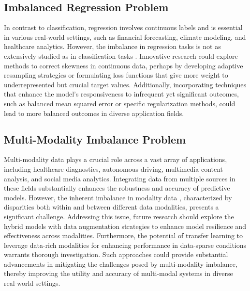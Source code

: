 \subsection{Imbalanced Regression Problem}

In contrast to classification, regression involves continuous labels and is essential in various real-world settings, such as financial forecasting, climate modeling, and healthcare analytics. However, the imbalance in regression tasks is not as extensively studied as in classification tasks \cite{gong2022ranksim,yang2021delving,gong2022ranksim}. Innovative research could explore methods to correct skewness in continuous data, perhaps by developing adaptive resampling strategies or formulating loss functions that give more weight to underrepresented but crucial target values. Additionally, incorporating techniques that enhance the model's responsiveness to infrequent yet significant outcomes, such as balanced mean squared error or specific regularization methods, could lead to more balanced outcomes in diverse application fields.

\subsection{Multi-Modality Imbalance Problem}

Multi-modality data plays a crucial role across a vast array of applications, including healthcare diagnostics, autonomous driving, multimedia content analysis, and social media analytics. Integrating data from multiple sources in these fields substantially enhances the robustness and accuracy of predictive models. However, the inherent imbalance in modality data \cite{qian2022co}, characterized by disparities both within and between different data modalities, presents a significant challenge. Addressing this issue, future research should explore the hybrid models with data augmentation strategies to enhance model resilience and effectiveness across modalities. Furthermore, the potential of transfer learning to leverage data-rich modalities for enhancing performance in data-sparse conditions warrants thorough investigation. Such approaches could provide substantial advancements in mitigating the challenges posed by multi-modality imbalance, thereby improving the utility and accuracy of multi-modal systems in diverse real-world settings.
